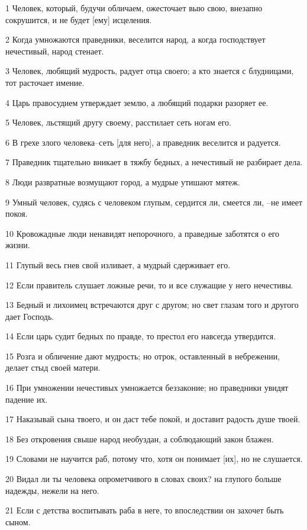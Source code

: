 \par 1 Человек, который, будучи обличаем, ожесточает выю свою, внезапно сокрушится, и не будет [ему] исцеления.
\par 2 Когда умножаются праведники, веселится народ, а когда господствует нечестивый, народ стенает.
\par 3 Человек, любящий мудрость, радует отца своего; а кто знается с блудницами, тот расточает имение.
\par 4 Царь правосудием утверждает землю, а любящий подарки разоряет ее.
\par 5 Человек, льстящий другу своему, расстилает сеть ногам его.
\par 6 В грехе злого человека--сеть [для него], а праведник веселится и радуется.
\par 7 Праведник тщательно вникает в тяжбу бедных, а нечестивый не разбирает дела.
\par 8 Люди развратные возмущают город, а мудрые утишают мятеж.
\par 9 Умный человек, судясь с человеком глупым, сердится ли, смеется ли, --не имеет покоя.
\par 10 Кровожадные люди ненавидят непорочного, а праведные заботятся о его жизни.
\par 11 Глупый весь гнев свой изливает, а мудрый сдерживает его.
\par 12 Если правитель слушает ложные речи, то и все служащие у него нечестивы.
\par 13 Бедный и лихоимец встречаются друг с другом; но свет глазам того и другого дает Господь.
\par 14 Если царь судит бедных по правде, то престол его навсегда утвердится.
\par 15 Розга и обличение дают мудрость; но отрок, оставленный в небрежении, делает стыд своей матери.
\par 16 При умножении нечестивых умножается беззаконие; но праведники увидят падение их.
\par 17 Наказывай сына твоего, и он даст тебе покой, и доставит радость душе твоей.
\par 18 Без откровения свыше народ необуздан, а соблюдающий закон блажен.
\par 19 Словами не научится раб, потому что, хотя он понимает [их], но не слушается.
\par 20 Видал ли ты человека опрометчивого в словах своих? на глупого больше надежды, нежели на него.
\par 21 Если с детства воспитывать раба в неге, то впоследствии он захочет быть сыном.
